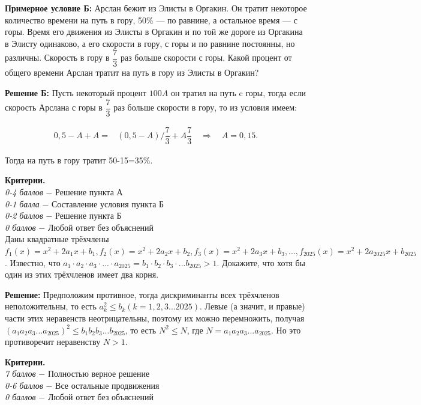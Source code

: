 \textbf{Примерное условие Б:} Арслан бежит из Элисты в Оргакин. Он тратит некоторое количество времени на путь в гору, 50\% — по равнине, а остальное время — с горы. Время его движения из Элисты в Оргакин и по той же дороге из Оргакина в Элисту одинаково, а его скорости в гору, с горы и по равнине постоянны, но различны. Скорость в гору в $\dfrac{7}{3}$ раз больше скорости с горы. Какой процент от общего времени Арслан тратит на путь в гору из Элисты в Оргакин?

\textbf{Решение Б:} Пусть некоторый процент $100A$ он тратил на путь c горы, тогда если скорость Арслана с горы в $\dfrac{7}{3}$ раз больше скорости в гору, то из условия имеем:

$$
\begin{aligned}
0,5-A+A= & (0,5-A )/ \dfrac{7}{3}+A \dfrac{7}{3} \quad \Rightarrow \quad A=0,15 .
\end{aligned}
$$

Тогда на путь в гору тратит 50-15=35\%.

\textbf{Критерии.} \\
\textit{0-4 баллов} $-$ Решение пункта А\\
\textit{0-1 балла} $-$ Составление условия пункта Б \\
\textit{0-2 баллов} $-$ Решение пункта Б\\
\textit{0 баллов} $-$ Любой ответ без объяснений\\


 Даны квадратные трёхчлены $f_1(x)=x^2+2 a_1 x+b_1, f_2(x)=x^2+2 a_2 x+b_2, f_3(x)=x^2+2 a_3 x+b_3, ...,f_{2025}(x)=x^2+2 a_{2025} x+b_{2025}$. Известно, что $a_1\cdot a_2\cdot a_3\cdot...\cdot a_{2025}=b_1\cdot b_2\cdot b_3\cdot ...b_{2025}>1$. Докажите, что хотя бы один из этих трёхчленов имеет два корня.

\textbf{Решение:} Предположим противное, тогда дискриминанты всех трёхчленов неположительны, то есть $a_k^2 \leqslant b_k(k=1,2,3...2025)$. Левые (а значит, и правые) части этих неравенств неотрицательны, поэтому их можно перемножить, получая $\left(a_1 a_2 a_3...a_{2025}\right)^2 \leqslant b_1 b_2 b_3...b_{2025}$, то есть $N^2 \leqslant N$, где $N=a_1 a_2 a_3...a_{2025}$. Но это противоречит неравенству $N>1$.

\textbf{Критерии.} \\
\textit{7 баллов} $-$ Полностью верное решение\\
\textit{0-6 баллов} $-$ Все остальные продвижения\\
\textit{0 баллов} $-$ Любой ответ без объяснений\\

